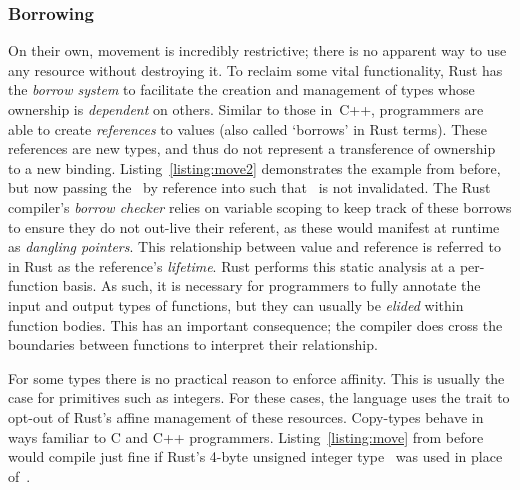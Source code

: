 \subsubsection{Borrowing}

On their own, movement is incredibly restrictive; there is no apparent way to use any resource without destroying it. To reclaim some vital functionality, Rust has the \textit{borrow system} to facilitate the creation and management of types whose ownership is \textit{dependent} on others. Similar to those in~C++, programmers are able to create \textit{references} to values (also called `borrows' in Rust terms). These references are new types, and thus do not represent a transference of ownership to a new binding. Listing~\ref{listing:move2} demonstrates the example from before, but now passing the~ by reference into  such that~ is not invalidated. The Rust compiler's \textit{borrow checker} relies on variable scoping to keep track of these borrows to ensure they do not out-live their referent, as these would manifest at runtime as \textit{dangling pointers}. This relationship between value and reference is referred to in Rust as the reference's \textit{lifetime}. Rust performs this static analysis at a per-function basis. As such, it is necessary for programmers to fully annotate the input and output types of functions, but they can usually be \textit{elided} within function bodies. This has an important consequence; the compiler does cross the boundaries between functions to interpret their relationship. 

For some types there is no practical reason to enforce affinity. This is usually the case for primitives such as integers. For these cases, the language uses the  trait to opt-out of Rust's affine management of these resources. Copy-types behave in ways familiar to C and C++ programmers. Listing~\ref{listing:move} from before would compile just fine if Rust's 4-byte unsigned integer type~ was used in place of~.

